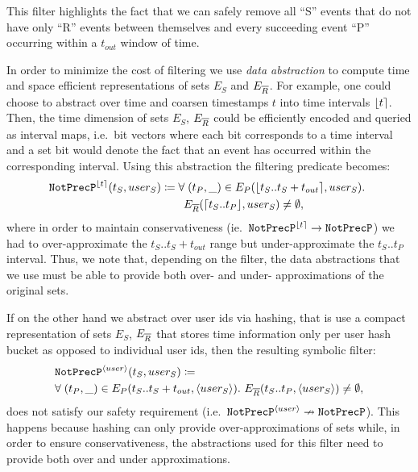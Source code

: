 This filter highlights the fact that we can safely remove all ``S'' events that
do not have only ``R'' events between themselves and every succeeding event
``P'' occurring within a $t_{out}$ window of time.

In order to minimize the cost of filtering we use {\em data
abstraction} to compute time and space efficient representations of sets $E_S$
and $E_{\overline{R}}$.
For example, one could choose to abstract over time and coarsen timestamps $t$
into time intervals $\lfloor t \rceil$. 
Then, the time dimension of sets $E_S$, $E_{\overline{R}}$ could be efficiently encoded
and queried as interval maps, i.e.\ bit vectors where each bit corresponds to a
time interval and a set bit would denote the fact that an event has occurred
within the corresponding interval.
Using this abstraction the filtering predicate becomes:
\begin{align*}
&
\NotPrecedesP^{\interval{t}}(t_S, user_S) \coloneq 
\forall\; (t_P, \_) \in E_P(\interval{t_S..t_S + t_{out}}, user_S) .\ 
\\
&
\qqqquad\qqquad
E_{\oR}(\uinterval{t_S..t_P}, user_S) \neq \emptyset ,
\end{align*}
where in order to maintain conservativeness (ie.\
$\texttt{NotPrecP}^{\lfloor t \rceil} \rightarrow \texttt{NotPrecP}$) we had to
over-approximate the $t_S..t_S + t_{out}$ range but under-approximate the
$t_S..t_P$ interval.
Thus, we note that, depending on the filter, the data abstractions that we
use must be able to provide both over- and under- approximations of the original
sets.

If on the other hand we abstract over user ids via hashing, that is
use a compact representation of sets $E_S$, $E_{\overline{R}}$ that stores time
information only per user hash bucket as opposed to individual user ids, then
the resulting symbolic filter:
\begin{align*}
&
\NotPrecedesP^{\hashid{user}}(t_S, user_S) \coloneq 
\\
&
\forall\; (t_P, \_) \in E_P(t_S..t_S + t_{out}, \hashid{user_S}) .\ 
E_{\oR}(t_S..t_P, \hashid{user_S}) \neq \emptyset ,
\end{align*}
does not satisfy our safety requirement 
(i.e.\ $\texttt{NotPrecP}^{\langle user \rangle} \nrightarrow \texttt{NotPrecP}$).
This happens because hashing can only provide over-approximations of sets while,
in order to ensure conservativeness, the abstractions used for this filter need
to provide both over and under approximations.

